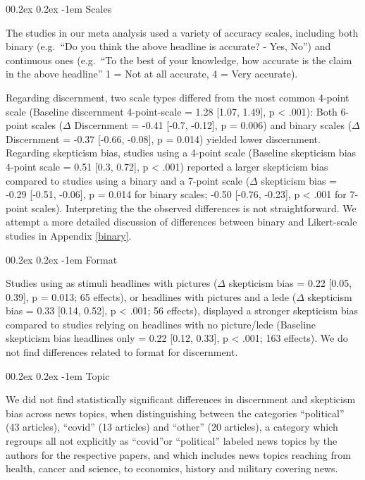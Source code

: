 \documentclass[
  doc,floatsintext]{apa6}
\makeatletter
\let\oldparagraph\paragraph
\renewcommand{\paragraph}[1]{\oldparagraph{#1}\mbox{}}
\renewcommand{\paragraph}{\@startsection{paragraph}{4}{\parindent}%
  {0\baselineskip \@plus 0.2ex \@minus 0.2ex}%
  {-1em}%
  {\normalfont\normalsize\bfseries\itshape\typesectitle}}
\makeatother
\begin{document}
\paragraph{Scales}\label{scales}

The studies in our meta analysis used a variety of accuracy scales, including both binary (e.g.~``Do you think the above headline is accurate? - Yes, No'') and continuous ones (e.g.~``To the best of your knowledge, how accurate is the claim in the above headline'' 1 = Not at all accurate, 4 = Very accurate).

Regarding discernment, two scale types differed from the most common 4-point scale (Baseline discernment 4-point-scale = 1.28 {[}1.07, 1.49{]}, p \textless{} .001): Both 6-point scales (\(\Delta\) Discernment = -0.41 {[}-0.7, -0.12{]}, p = 0.006) and binary scales (\(\Delta\) Discernment = -0.37 {[}-0.66, -0.08{]}, p = 0.014) yielded lower discernment. Regarding skepticism bias, studies using a 4-point scale (Baseline skepticism bias 4-point scale = 0.51 {[}0.3, 0.72{]}, p \textless{} .001) reported a larger skepticism bias compared to studies using a binary and a 7-point scale (\(\Delta\) skepticism bias = -0.29 {[}-0.51, -0.06{]}, p = 0.014 for binary scales; -0.50 {[}-0.76, -0.23{]}, p \textless{} .001 for 7-point scales). Interpreting the the observed differences is not straightforward. We attempt a more detailed discussion of differences between binary and Likert-scale studies in Appendix \ref{binary}.

\paragraph{Format}\label{format}

Studies using as stimuli headlines with pictures (\(\Delta\) skepticism bias = 0.22 {[}0.05, 0.39{]}, p = 0.013; 65 effects), or headlines with pictures and a lede (\(\Delta\) skepticism bias = 0.33 {[}0.14, 0.52{]}, p \textless{} .001; 56 effects), displayed a stronger skepticism bias compared to studies relying on headlines with no picture/lede (Baseline skepticism bias headlines only = 0.22 {[}0.12, 0.33{]}, p \textless{} .001; 163 effects). We do not find differences related to format for discernment.

\paragraph{Topic}\label{topic}

We did not find statistically significant differences in discernment and skepticism bias across news topics, when distinguishing between the categories ``political'' (43 articles), ``covid'' (13 articles) and ``other'' (20 articles), a category which regroups all not explicitly as ``covid''or ``political'' labeled news topics by the authors for the respective papers, and which includes news topics reaching from health, cancer and science, to economics, history and military covering news.
\end{document}
